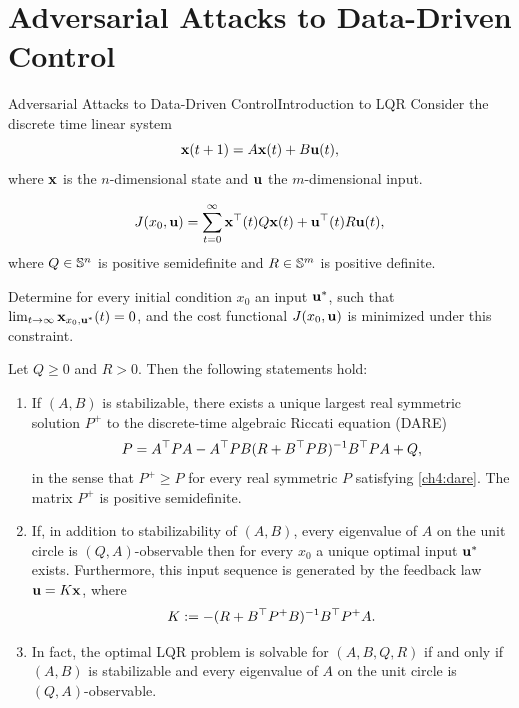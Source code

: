 \documentclass[aspectratio=169, handout, 10pt, hyperref=colorlinks]{beamer}
\newcommand*{\enumbreak}{\usebeamertemplate{enumerate end}\framebreak\usebeamertemplate{enumerate begin}}
\begin{document}
\section{Adversarial Attacks to Data-Driven Control}
\begin{frame}[allowframebreaks]{Adversarial Attacks to Data-Driven Control}{Introduction to LQR}
Consider the discrete time linear system 
\begin{equation} \label{ch4:e:disc}
\bmx(t+1) = A \bmx(t) + B \bmu(t),
\end{equation}
where $\bmx$ is the $n$-dimensional state and $\bmu$ the $m$-dimensional input.

\begin{defn}
\begin{equation}\label{ch4:e:cost}
J(x_0,\bmu)=\sum_{t=0}^\infty  \bmx^\top(t) Q \bmx(t) + \bmu^\top(t) R \bmu(t),
\end{equation}
where $Q \in \S{n}$ is positive semidefinite and $R \in \S{m}$ is positive definite.
\end{defn}
\begin{problem}
    Determine for every initial condition $x_0$ an input $\bmu^*$, such that $\lim_{t\to\infty} \bmx_{x_0,\bmu^*}(t) = 0$, and the cost functional $J(x_0,\bmu)$ is minimized under this constraint. 
\end{problem}

\begin{theorem}\label{ch4:t:Harry}
    Let $Q \geq 0$ and $R >0$. Then the following statements hold:  
    \begin{enumerate}
        \item If $(A,B)$ is stabilizable, there exists a unique largest real symmetric solution $P^+$ to the discrete-time algebraic Riccati equation (DARE) 
        \begin{equation}
        \label{ch4:dare}
        P = A^\top PA-A^\top PB(R+B^\top P B)\inv B^\top  P A+Q,
        \end{equation}
        in the sense that $P^+ \geq P$ for every real symmetric $P$ satisfying \eqref{ch4:dare}. The matrix $P^+$ is positive semidefinite.
        \item If, in addition to stabilizability of $(A,B)$, every eigenvalue of $A$ on the unit circle is $(Q,A)$-observable then for every $x_0$ a unique optimal input $\bmu^*$ exists. Furthermore, this input sequence is generated by the feedback law $\bmu = K \bmx$, where
        \begin{equation}
        \label{ch4:optgain}
        K := -(R+B^\top P^+ B)\inv B^\top  P^+ A.
        \end{equation}
        \item In fact, the optimal LQR problem is solvable for $(A,B,Q,R)$ if and only if $(A,B)$ is stabilizable and every eigenvalue of $A$ on the unit circle is $(Q,A)$-observable. 
    \end{enumerate}
\end{theorem}
\end{frame}
\end{document}
